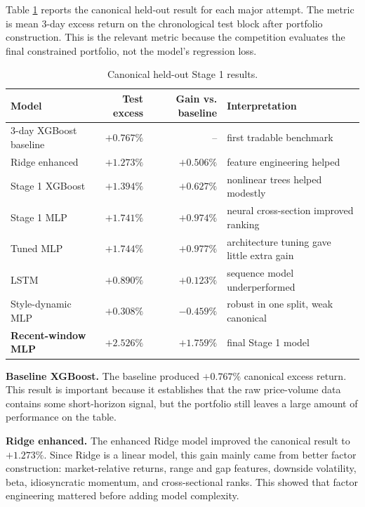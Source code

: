 \documentclass[11pt]{article}
\begin{document}
Table \ref{tab:main-results} reports the canonical held-out result for each
major attempt. The metric is mean 3-day excess return on the chronological test
block after portfolio construction. This is the relevant metric because the
competition evaluates the final constrained portfolio, not the model's
regression loss.

\begin{table}[h]
\centering
\caption{Canonical held-out Stage 1 results.}
\label{tab:main-results}
\begin{tabular}{p{}rrp{}}
\toprule
Model & Test excess & Gain vs. baseline & Interpretation \\
\midrule
3-day XGBoost baseline & \(+0.767\%\) & -- & first tradable benchmark \\
Ridge enhanced & \(+1.273\%\) & \(+0.506\%\) & feature engineering helped \\
Stage 1 XGBoost & \(+1.394\%\) & \(+0.627\%\) & nonlinear trees helped modestly \\
Stage 1 MLP & \(+1.741\%\) & \(+0.974\%\) & neural cross-section improved ranking \\
Tuned MLP & \(+1.744\%\) & \(+0.977\%\) & architecture tuning gave little extra gain \\
LSTM & \(+0.890\%\) & \(+0.123\%\) & sequence model underperformed \\
Style-dynamic MLP & \(+0.308\%\) & \(-0.459\%\) & robust in one split, weak canonical \\
\textbf{Recent-window MLP} & \(\mathbf{+2.526\%}\) & \(\mathbf{+1.759\%}\) & final Stage 1 model \\
\bottomrule
\end{tabular}
\end{table}

\textbf{Baseline XGBoost.}
The baseline produced \(+0.767\%\) canonical excess return. This result is
important because it establishes that the raw price-volume data contains some
short-horizon signal, but the portfolio still leaves a large amount of
performance on the table.

\textbf{Ridge enhanced.}
The enhanced Ridge model improved the canonical result to \(+1.273\%\). Since
Ridge is a linear model, this gain mainly came from better factor construction:
market-relative returns, range and gap features, downside volatility, beta,
idiosyncratic momentum, and cross-sectional ranks. This showed that factor
engineering mattered before adding model complexity.
\end{document}
